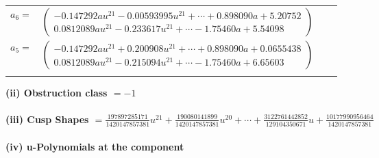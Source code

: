 \documentclass[1p]{elsarticle_modified}
\theoremstyle{definition}
\begin{document}
\begin{tabular}{m{7pt} m{180pt} m{7pt} m{180pt} }
\flushright $a_{6}=$&$\begin{pmatrix}-0.147292 a u^{21}-0.00593995 u^{21}+\cdots+0.898090 a+5.20752\\0.0812089 a u^{21}-0.233617 u^{21}+\cdots-1.75460 a+5.54098\end{pmatrix}$ \\
\flushright $a_{5}=$&$\begin{pmatrix}-0.147292 a u^{21}+0.200908 u^{21}+\cdots+0.898090 a+0.0655438\\0.0812089 a u^{21}-0.215094 u^{21}+\cdots-1.75460 a+6.65603\end{pmatrix}$\\&\end{tabular}
\flushleft \textbf{(ii) Obstruction class $= -1$}\\~\\
\flushleft \textbf{(iii) Cusp Shapes $= \frac{197897285171}{1420147857381} u^{21}+\frac{190080141899}{1420147857381} u^{20}+\cdots+\frac{3122761442852}{129104350671} u+\frac{10177990956464}{1420147857381}$}\\~\\
\newpage\renewcommand{\arraystretch}{1}
\flushleft \textbf{(iv) u-Polynomials at the component}\newline \\
\end{document}
